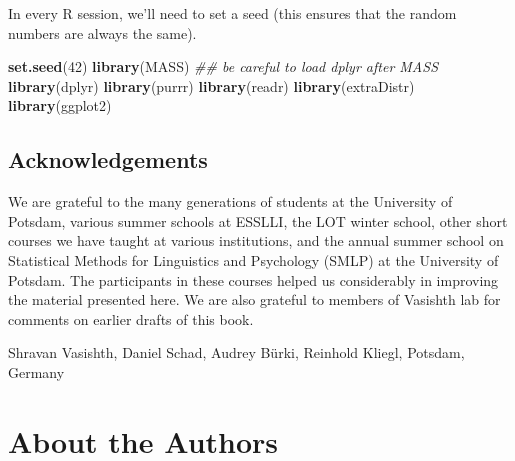 \documentclass[12pt,]{krantz}
\newenvironment{Shaded}{\begin{snugshade}}{\end{snugshade}}
\newcommand{\CommentTok}[1]{\textcolor[rgb]{0.56,0.35,0.01}{\textit{#1}}}
\newcommand{\DecValTok}[1]{\textcolor[rgb]{0.00,0.00,0.81}{#1}}
\newcommand{\KeywordTok}[1]{\textcolor[rgb]{0.13,0.29,0.53}{\textbf{#1}}}
\newcommand{\NormalTok}[1]{#1}
\begin{document}
In every R session, we'll need to set a seed (this ensures that the random numbers are always the same).

\begin{Shaded}
\begin{Highlighting}[]
\KeywordTok{set.seed}\NormalTok{(}\DecValTok{42}\NormalTok{)}
\KeywordTok{library}\NormalTok{(MASS)}
\CommentTok{## be careful to load dplyr after MASS}
\KeywordTok{library}\NormalTok{(dplyr)}
\KeywordTok{library}\NormalTok{(purrr)}
\KeywordTok{library}\NormalTok{(readr)}
\KeywordTok{library}\NormalTok{(extraDistr)}
\KeywordTok{library}\NormalTok{(ggplot2)}
\end{Highlighting}
\end{Shaded}

\hypertarget{acknowledgements}{%
\section{Acknowledgements}\label{acknowledgements}}

We are grateful to the many generations of students at the University of Potsdam, various summer schools at ESSLLI, the LOT winter school, other short courses we have taught at various institutions, and the annual summer school on Statistical Methods for Linguistics and Psychology (SMLP) at the University of Potsdam. The participants in these courses helped us considerably in improving the material presented here. We are also grateful to members of Vasishth lab for comments on earlier drafts of this book.

\begin{flushright}
Shravan Vasishth,
Daniel Schad,
Audrey Bürki,
Reinhold Kliegl,
Potsdam, Germany
\end{flushright}

\hypertarget{about-the-authors}{%
\chapter*{About the Authors}\label{about-the-authors}}
\end{document}
